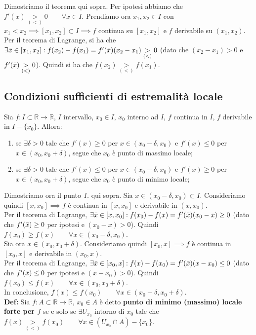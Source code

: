 \documentclass{article}
\begin{document}
\noindent Dimostriamo il teorema qui sopra. Per ipotesi abbiamo che $f'(x) \underset{(<)}{>} 0 \qquad \forall x \in I$. Prendiamo ora $x_1, x_2 \in I$ con $x_1 < x_2 \implies [x_1, x_2] \subset I \implies f$ continua su $[x_1, x_2]$ e $f$ derivabile su $(x_1, x_2)$.\\
Per il teorema di Lagrange, si ha che $\exists \Bar{x} \in [x_1, x_2] : f(x_2) - f(x_1) = f'(\Bar{x})(x_2 - x_1) \underset{(<)}{>} 0$ (dato che $(x_2 - x_1) > 0$ e $f'(\Bar{x}) \underset{(<)}{>} 0$). Quindi si ha che $f(x_2) \underset{(<)}{>} f(x_1)$.

\subsection{Condizioni sufficienti di estremalità locale}
Sia $f: I \subset \mathbb{R} \xrightarrow{} \mathbb{R}$, $I$ intervallo, $x_0 \in I$, $x_0$ interno ad $I$, $f$ continua in $I$, $f$ derivabile in $I - \{x_0\}$. Allora:
\begin{enumerate}
    \item se $\exists \delta > 0$ tale che $f'(x) \geq 0$ per $x \in (x_0 - \delta, x_0)$ e $f'(x) \leq 0$ per $x \in (x_0, x_0 + \delta)$, segue che $x_0$ è punto di massimo locale;
    \item se $\exists \delta > 0$ tale che $f'(x) \leq 0$ per $x \in (x_0 - \delta, x_0)$ e $f'(x) \geq 0$ per $x \in (x_0, x_0 + \delta)$, segue che $x_0$ è punto di minimo locale;
\end{enumerate}

\noindent Dimostriamo ora il punto \textit{1.} qui sopra. Sia $x \in (x_0 - \delta, x_0) \subset I$. Consideriamo quindi $[x, x_0] \implies f$ è continua in $[x, x_0]$ e derivabile in $(x, x_0)$.\\
Per il teorema di Lagrange, $\exists \Bar{x} \in [x, x_0] : f(x_0) - f(x) = f'(\Bar{x})(x_0 - x) \geq 0$ (dato che $f'(\Bar{x}) \geq 0$ per ipotesi e $(x_0 - x) > 0$). Quindi $f(x_0) \geq f(x) \qquad \forall x \in (x_0 - \delta, x_0)$.\\
Sia ora $x \in (x_0, x_0 + \delta)$. Consideriamo quindi $[x_0, x] \implies f$ è continua in $[x_0, x]$ e derivabile in $(x_0, x)$. \\
Per il teorema di Lagrange, $\exists \Bar{x} \in [x_0, x] : f(x) - f(x_0) = f'(\Bar{x})(x - x_0) \leq 0$ (dato che $f'(\Bar{x}) \leq 0$ per ipotesi e $(x - x_0) > 0$). Quindi $f(x_0) \leq f(x) \qquad \forall x \in (x_0, x_0 + \delta)$.\\
In conclusione, $f(x) \leq f(x_0) \qquad \forall x \in (x_0 - \delta, x_0 + \delta)$.\\

\noindent\textbf{Def:} Sia $f: A \subset \mathbb{R} \xrightarrow{} \mathbb{R}$, $x_0 \in A$ è detto \textbf{punto di minimo (massimo) locale forte per $f$} se e solo se $\exists U_{x_0}$ intorno di $x_0$ tale che $f(x) \underset{(<)}{>} f(x_0) \qquad \forall x \in (U_{x_0} \cap A) - \{x_0\}$.
\end{document}
